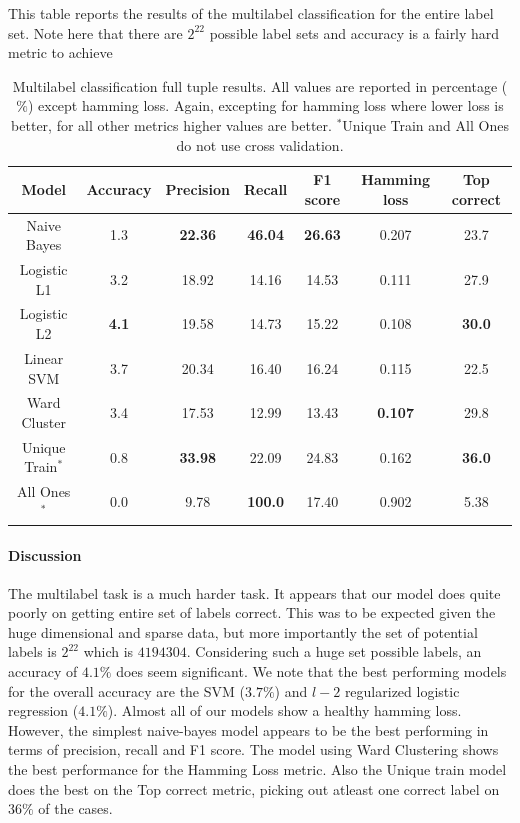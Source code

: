 \documentclass{article} %
\begin{document}
This table reports the results of the multilabel classification for the entire label set. Note here that there are $2^{22}$ possible label sets and accuracy is a fairly hard metric to achieve
\begin{table}[h]
\begin{center}
\begin{tabular}{|c|c|c|c|c|c|c|}
\hline
 Model       & Accuracy & Precision & Recall    & F1 score  & Hamming loss & Top correct\\ \hline
 Naive Bayes & 1.3      & \bf{22.36}& \bf{46.04}& \bf{26.63}& 0.207     & 23.7      \\ \hline
 Logistic L1 & 3.2      & 18.92     & 14.16     & 14.53     & 0.111     & 27.9      \\ \hline
 Logistic L2 & \bf{4.1} & 19.58     & 14.73     & 15.22     & 0.108     & \bf{30.0} \\ \hline
 Linear SVM  & 3.7      & 20.34     & 16.40     & 16.24     & 0.115     & 22.5      \\ \hline
 Ward Cluster& 3.4      & 17.53     & 12.99     & 13.43     & \bf{0.107}& 29.8      \\ \hline \hline
 Unique Train$^*$& 0.8      & \bf{33.98}& 22.09     & 24.83     & 0.162     & \bf{36.0} \\ \hline
 All Ones$^*$    & 0.0      & 9.78      & \bf{100.0}& 17.40     & 0.902     & 5.38      \\ \hline
\end{tabular}
\caption{Multilabel classification full tuple results. All values are reported in percentage ($\%$) except hamming loss. Again, excepting for hamming loss where lower loss is better, for all other metrics higher values are better. $^*$Unique Train and All Ones do not use cross validation.}
\end{center}
\end{table}
\paragraph{Discussion}
The multilabel task is a much harder task. It appears that our model does quite poorly on getting entire set of labels correct. This was to be expected given the huge dimensional and sparse data, but more importantly the set of potential labels is $2^22$ which is $4194304$. Considering such a huge set possible labels, an accuracy of $4.1\%$ does seem significant.
We note that the best performing models for the overall accuracy are the SVM ($3.7\%$) and  $l-2$ regularized logistic regression ($4.1\%$). Almost all of our models show a healthy hamming loss. However, the simplest naive-bayes model appears to be the best performing in terms of precision, recall and F1 score.  The model using Ward Clustering shows the best performance for the Hamming Loss metric. Also the Unique train model does the best on the Top correct metric, picking out atleast one correct label on $36\%$ of the cases.
\end{document}
